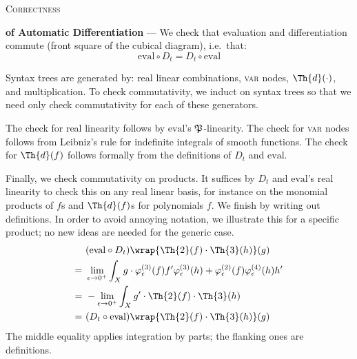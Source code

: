 \begin{center}\large\textsc{Correctness}\end{center}

    \textbf{of Automatic Differentiation} ---
    We check that evaluation and differentiation commute (front square of
    the cubical diagram), i.e.\ that:
    $$
        \text{eval}\circ D_t 
        =
        D_t\circ \text{eval} 
    $$

    Syntax trees are generated by: real linear combinations, \textsc{var}
    nodes, $\Th{d}(\cdot)$, and multiplication.  To check commutativity, we
    induct on syntax trees so that we need only check commutativity for each of
    these generators.

    The check for real linearity follows by
    $\text{eval}$'s $\frak P$-linearity.  The check for \textsc{var}
    nodes follows from Leibniz's rule for indefinite integrals of smooth
    functions.  The check for $\Th{d}(f)$ follows formally from the
    definitions of $D_t$ and $\text{eval}$.  

    Finally, we check commutativity on products.  It suffices by $D_t$ and
    $\text{eval}$'s real linearity to check this on any real linear basis,
    for instance on the monomial products of $f$s and $\Th{d}(f)$s for
    polynomials $f$.  We finish by writing out definitions.  In order to avoid
    annoying notation, we illustrate this for a specific product; no new ideas
    are needed for the generic case.
    \begin{align*}
        &~(\text{eval}\circ D_t)\wrap{
            \Th{2}(f)
            \cdot
            \Th{3}(h)
        }(g)
        \\
        =
        &~\lim_{\epsilon\to 0^+}
            \int_X g \cdot
            \varphi_\epsilon^{(3)}(f) f^\prime \varphi_\epsilon^{(3)}(h)
            +
            \varphi_\epsilon^{(2)}(f) \varphi_\epsilon^{(4)}(h) h^\prime
        \\
        =
        &~-\lim_{\epsilon\to 0^+}
            \int_X g^\prime \cdot
            \Th{2}(f)
            \cdot
            \Th{3}(h)
        \\
        =
        &~(D_t \circ \text{eval})\wrap{
            \Th{2}(f)
            \cdot
            \Th{3}(h)
        }(g)
    \end{align*}
    The middle equality applies integration by parts; the flanking
    ones are definitions.
    
